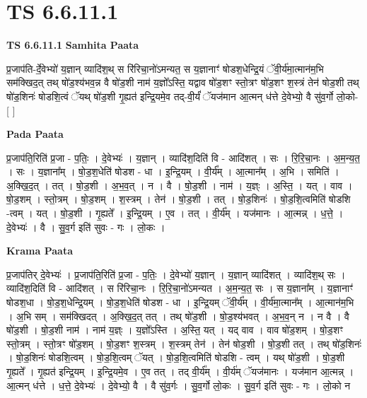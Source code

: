 \documentclass[17pt]{extarticle}
\begin{document}
\section{ TS 6.6.11.1 }

\textbf{TS 6.6.11.1 } \newline
\textbf{Samhita Paata} \newline

प्र॒जाप॑ति-र्दे॒वेभ्यो॑ य॒ज्ञान् व्यादि॑श॒थ् स रि॑रिचा॒नो॑ऽमन्यत॒ स य॒ज्ञानाꣳ॑ षोडश॒धेन्द्रि॒यं ॅवी॒र्य॑मा॒त्मान॑म॒भि सम॑क्खिद॒त् तथ् षो॑ड॒श्य॑भव॒न्न वै षो॑ड॒शी नाम॑ य॒ज्ञो᳚ऽस्ति॒ यद्वाव षो॑ड॒शꣳ स्तो॒त्रꣳ षो॑ड॒शꣳ श॒स्त्रं तेन॑ षोड॒शी तथ् षो॑ड॒शिनः॑ षोडशि॒त्वं ॅयथ् षो॑ड॒शी गृ॒ह्यत॑ इन्द्रि॒यमे॒व तद्-वी॒र्यं॑ ॅयज॑मान आ॒त्मन् ध॑त्ते दे॒वेभ्यो॒ वै सु॑व॒र्गो लो॒को- [  ] \newline

\textbf{Pada Paata} \newline

प्र॒जाप॑ति॒रिति॑ प्र॒जा - प॒तिः॒ । दे॒वेभ्यः॑ । य॒ज्ञान् । व्यादि॑श॒दिति॑ वि - आदि॑शत् । सः । रि॒रि॒चा॒नः । अ॒म॒न्य॒त॒ । सः । य॒ज्ञाना᳚म् । षो॒ड॒श॒धेति॑ षोडश - धा । इ॒न्द्रि॒यम् । वी॒र्य᳚म् । आ॒त्मान᳚म् । अ॒भि । समिति॑ । अ॒क्खि॒द॒त् । तत् । षो॒ड॒शी । अ॒भ॒व॒त् । न । वै । षो॒ड॒शी । नाम॑ । य॒ज्ञ्ः । अ॒स्ति॒ । यत् । वाव । षो॒ड॒शम् । स्तो॒त्रम् । षो॒ड॒शम् । श॒स्त्रम् । तेन॑ । षो॒ड॒शी । तत् । षो॒ड॒शिनः॑ । षो॒ड॒शि॒त्वमिति॑ षोडशि -त्वम् । यत् । षो॒ड॒शी । गृ॒ह्यते᳚ । इ॒न्द्रि॒यम् । ए॒व । तत् । वी॒र्य᳚म् । यज॑मानः । आ॒त्मन्न् । ध॒त्ते॒ । दे॒वेभ्यः॑ । वै । सु॒व॒र्ग इति॑ सुवः - गः । लो॒कः ।  \newline


\textbf{Krama Paata} \newline

प्र॒जाप॑तिर् दे॒वेभ्यः॑ । प्र॒जाप॑ति॒रिति॑ प्र॒जा - प॒तिः॒ । दे॒वेभ्यो॑ य॒ज्ञान् । य॒ज्ञान् व्यादि॑शत् । व्यादि॑श॒थ् सः । व्यादि॑श॒दिति॑ वि - आदि॑शत् । स रि॑रिचा॒नः । रि॒रि॒चा॒नो॑ऽमन्यत । अ॒म॒न्य॒त॒ सः । स य॒ज्ञाना᳚म् । य॒ज्ञानाꣳ॑ षोडश॒धा । षो॒ड॒श॒धेन्द्रि॒यम् । षो॒ड॒श॒धेति॑ षोडश - धा । इ॒न्द्रि॒यम् ॅवी॒र्य᳚म् । वी॒र्य॑मा॒त्मान᳚म् । आ॒त्मान॑म॒भि । अ॒भि सम् । सम॑क्खिदत् । अ॒क्खि॒द॒त् तत् । तथ् षो॑ड॒शी । षो॒ड॒श्य॑भवत् । अ॒भ॒व॒न् न । न वै । वै षो॑ड॒शी । षो॒ड॒शी नाम॑ । नाम॑ य॒ज्ञ्ः । य॒ज्ञो᳚ऽस्ति । अ॒स्ति॒ यत् । यद् वाव । वाव षो॑ड॒शम् । षो॒ड॒शꣳ स्तो॒त्रम् । स्तो॒त्रꣳ षो॑ड॒शम् । षो॒ड॒शꣳ श॒स्त्रम् । श॒स्त्रम् तेन॑ । तेन॑ षोड॒शी । षो॒ड॒शी तत् । तथ् षो॑ड॒शिनः॑ । षो॒ड॒शिनः॑ षोडशि॒त्वम् । षो॒ड॒शि॒त्वम् ॅयत् । षो॒ड॒शि॒त्वमिति॑ षोडशि - त्वम् । यथ् षो॑ड॒शी । षो॒ड॒शी गृ॒ह्यते᳚ । गृ॒ह्यत॑ इन्द्रि॒यम् । इ॒न्द्रि॒यमे॒व । ए॒व तत् । तद् वी॒र्य᳚म् । वी॒र्य॑म् ॅयज॑मानः । यज॑मान आ॒त्मन्न् । आ॒त्मन् ध॑त्ते । ध॒त्ते॒ दे॒वेभ्यः॑ । दे॒वेभ्यो॒ वै । वै सु॑व॒र्गः । सु॒व॒र्गो लो॒कः । सु॒व॒र्ग इति॑ सुवः - गः । लो॒को न \newline
\end{document}
